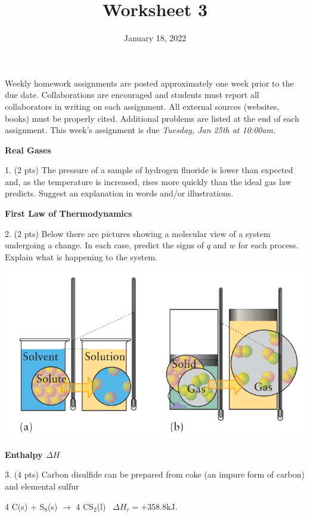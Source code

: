 \documentclass[11pt]{article}
\title{\textbf{Worksheet 3}}
\date{\vspace{-2em}January 18, 2022}
\begin{document}
\maketitle

Weekly homework assignments are posted approximately one week prior to the
due date. Collaborations are encouraged and students must report all collaborators
in writing on each assignment. All external sources (websites, books) must be
properly cited. Additional problems are listed at the end of each assignment.
This week's assignment is due \textit{Tuesday, Jan 25th at 10:00am.}


\textbf{Real Gases}

1. (2 pts) The pressure of a sample of hydrogen fluoride is lower than expected and, as the
temperature is increased, rises more quickly than the ideal gas law predicts.
Suggest an explanation in words and/or illustrations.

\vspace{1in}

\textbf{First Law of Thermodynamics}

2. (2 pts) Below there are pictures showing a molecular view of a system
undergoing a change. In each case, predict the signs of $q$ and $w$ for
 each process. Explain what is happening to the system.

\begin{center}
  \includegraphics[scale=0.35]{phase_change.png}
\end{center}

\vspace{1.5in}

\textbf{Enthalpy $\Delta H$}

3. (4 pts) Carbon disulfide can be prepared from coke (an impure form of carbon) and
elemental sulfur

\begin{center}
  4 C(s) + S$_8$(s) $\rightarrow$ 4 CS$_2$(l) \, $\Delta H_r = +358.8\text{kJ}$.
\end{center}
\end{document}
